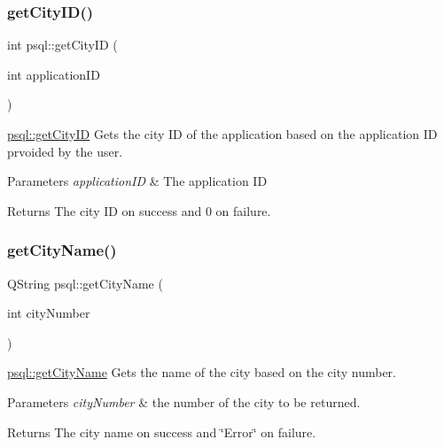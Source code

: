 \subsubsection{\texorpdfstring{get\+City\+I\+D()}{getCityID()}}
{\footnotesize\ttfamily int psql\+::get\+City\+ID (\begin{DoxyParamCaption}\item[{int}]{application\+ID }\end{DoxyParamCaption})}



\hyperlink{classpsql_af3462a12dc106e0ca8df4fa8fcf28436}{psql\+::get\+City\+ID} Gets the city ID of the application based on the application ID prvoided by the user. 


\begin{DoxyParams}{Parameters}
{\em application\+ID} & The application ID \\
\hline
\end{DoxyParams}
\begin{DoxyReturn}{Returns}
The city ID on success and 0 on failure. 
\end{DoxyReturn}
\mbox{\label{classpsql_a7acc18034ef60c8a1e69b0e1a15d8ab2}} 
\subsubsection{\texorpdfstring{get\+City\+Name()}{getCityName()}}
{\footnotesize\ttfamily Q\+String psql\+::get\+City\+Name (\begin{DoxyParamCaption}\item[{int}]{city\+Number }\end{DoxyParamCaption})}



\hyperlink{classpsql_a7acc18034ef60c8a1e69b0e1a15d8ab2}{psql\+::get\+City\+Name} Gets the name of the city based on the city number. 


\begin{DoxyParams}{Parameters}
{\em city\+Number} & the number of the city to be returned. \\
\hline
\end{DoxyParams}
\begin{DoxyReturn}{Returns}
The city name on success and \char`\"{}\+Error\char`\"{} on failure. 
\end{DoxyReturn}
\mbox{\label{classpsql_a42ee0cf90055ba6a7a6f564cf04d8bb8}} 

